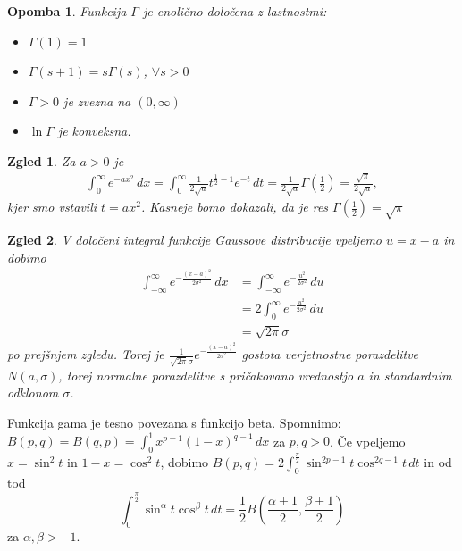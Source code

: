 \documentclass[10pt, a4paper]{article}
\newtheorem*{opomba}{Opomba}
\newtheorem{zgled}{Zgled}[section]
\begin{document}
\begin{opomba}
    Funkcija $\Gamma$ je enolično določena z lastnostmi:
    \begin{itemize}
        \item $\Gamma(1) = 1$
        \item $\Gamma(s + 1) = s \Gamma (s)$, $\forall s > 0$
        \item $\Gamma > 0$ je zvezna na $(0, \infty)$
        \item $\ln \Gamma$ je konveksna.
    \end{itemize}
\end{opomba}

\begin{zgled}
    Za $a > 0$ je 
    \begin{align*}
        \int_0 ^\infty e^{-ax^2}\, dx = \int_0 ^\infty \frac{1}{2 \sqrt{a}} t^{\frac{1}{2} - 1} e^{-t}\, dt = \frac{1}{2\sqrt{a}} \Gamma(\frac{1}{2}) = \frac{\sqrt{\pi}}{2 \sqrt{a}},
    \end{align*}
    kjer smo vstavili $t = ax^2$.
    Kasneje bomo dokazali, da je res $\Gamma(\frac{1}{2}) = \sqrt{\pi}$
\end{zgled}

\begin{zgled}
    V določeni integral funkcije Gaussove distribucije vpeljemo $u = x - a$
    in dobimo 
    \begin{align*}
        \int_{-\infty} ^\infty e^{-\frac{(x - a)^2}{2\sigma^2}} \, dx &= \int_{-\infty} ^\infty e^{-\frac{u^2}{2 \sigma^2}}\, du\\
        &= 2 \int_0 ^\infty e^{-\frac{u^2}{2\sigma^2}}\, du\\
        &= \sqrt{2 \pi} \sigma
    \end{align*}
    po prejšnjem zgledu.
    Torej je $\frac{1}{\sqrt{2\pi}\sigma} e^{-\frac{(x-a)^2}{2 \sigma^2}}$ gostota verjetnostne porazdelitve $N(a, \sigma)$,
    torej normalne porazdelitve s pričakovano vrednostjo $a$ in standardnim odklonom $\sigma$.
\end{zgled}

Funkcija gama je tesno povezana s funkcijo beta.
Spomnimo: $B(p, q) = B(q, p) = \int_0 ^1 x^{p - 1} (1 - x)^{q - 1}\, dx$ za $p, q > 0$.
Če vpeljemo $x = \sin^2 t$ in $1 - x = \cos^2 t$,
dobimo $B(p, q) = 2 \int_0 ^\frac{\pi}{2} \sin^{2p - 1} t \cos^{2q - 1} t\, dt$ 
in od tod $$\int_0 ^\frac{\pi}{2} \sin^\alpha t \cos^\beta t\, dt = \frac{1}{2} B\left(\frac{\alpha + 1}{2}, \frac{\beta + 1}{2}\right)$$
za $\alpha, \beta > -1$.
\end{document}
